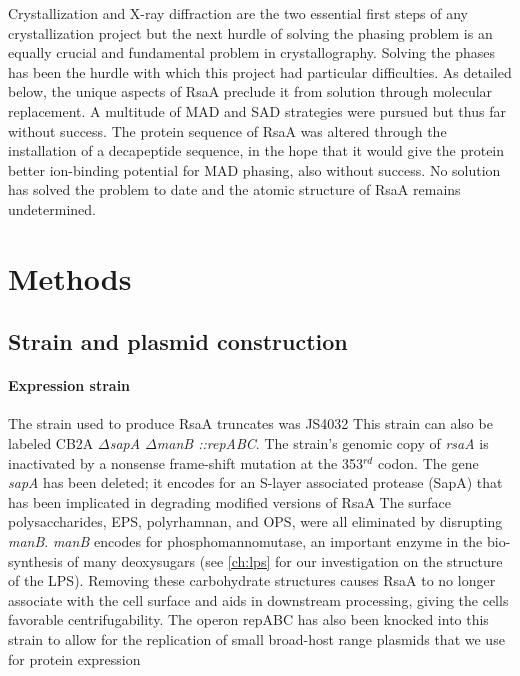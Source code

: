 Crystallization and X-ray diffraction are the two essential first steps of any
crystallization project but the next hurdle of solving the phasing problem is an
equally crucial and fundamental problem in crystallography. Solving the phases
has been the hurdle with which this project had particular difficulties. As detailed below, the unique aspects of
RsaA preclude it from solution through molecular replacement. A multitude of
\ac{MAD} and \ac{SAD} strategies were pursued but thus far without success. The
protein sequence of RsaA was altered through the installation of a decapeptide
sequence, in the hope that it would give the protein better ion-binding
potential for \ac{MAD} phasing, also without success. No solution has solved the problem to date and the atomic structure of RsaA remains undetermined.

\section{Methods}
\label{sec:crystal-materials-and-methods}

\subsection{Strain and plasmid construction}\label{sec:stra-plasm-constr}

\paragraph{Expression strain} The strain used to produce RsaA truncates was JS4032 
This strain can also be labeled \caulobacter{} CB2A \textit{$\Delta$sapA $\Delta$manB ::repABC}. The strain's genomic copy of \textit{rsaA} is inactivated by a nonsense frame-shift mutation at the 353$^{rd}$ codon. The gene \textit{sapA} has been deleted; it encodes for an S-layer associated protease (SapA) that has been implicated in degrading modified versions of RsaA The surface polysaccharides, \ac{EPS}, polyrhamnan, and \ac{OPS}, were all eliminated by disrupting \textit{manB}. \textit{manB} encodes for phosphomannomutase, an important enzyme in the bio-synthesis of many deoxysugars (see \cref{ch:lps} for our investigation on the structure of the \ac{LPS}). Removing these carbohydrate structures causes RsaA to no longer associate with the cell surface and aids in downstream processing, giving the cells favorable centrifugability. The operon repABC has also been knocked into this strain to allow for the replication of small broad-host range plasmids that we use for protein expression

